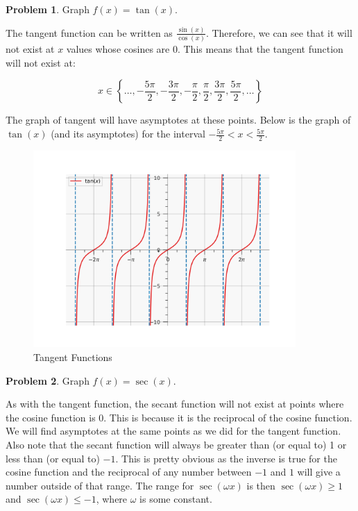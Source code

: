 \documentclass[12pt]{article}
\theoremstyle{definition}
\newtheorem{problem}{Problem}
\begin{document}
\begin{problem}
Graph $f(x)=\tan(x)$.
\end{problem}

The tangent function can be written as $\frac{\sin(x)}{\cos(x)}$.
Therefore, we can see that it will not exist at $x$ values whose cosines are 0.
This means that the tangent function will not exist at:

\begin{equation}
    x \in \left\{\dots, -\frac{5\pi}{2}, -\frac{3\pi}{2}, -\frac{\pi}{2}, \frac{\pi}{2}, \frac{3\pi}{2}, \frac{5\pi}{2}, \dots \right\}
\end{equation}

The graph of tangent will have asymptotes at these points.
Below is the graph of $\tan(x)$ (and its asymptotes) for the interval $-\frac{5\pi}{2} < x < \frac{5\pi}{2}$.

\begin{figure}[H]
    \centering
    \includegraphics[width=10cm, keepaspectratio]{graph_14.png}
    \caption{Tangent Functions}
    \label{fig:fig14}
\end{figure}

\begin{problem}
Graph $f(x)=\sec(x)$.
\end{problem}

As with the tangent function, the secant function will not exist at points where the cosine function is 0.
This is because it is the reciprocal of the cosine function.
We will find asymptotes at the same points as we did for the tangent function.
Also note that the secant function will always be greater than (or equal to) 1 or less than (or equal to) $-1$.
This is pretty obvious as the inverse is true for the cosine function and the reciprocal of any number between $-1$ and $1$ will give a number outside of that range.
The range for $\sec(\omega x)$ is then $\sec(\omega x) \geq 1$ and $\sec(\omega x) \leq -1$, where $\omega$ is some constant.
\end{document}
